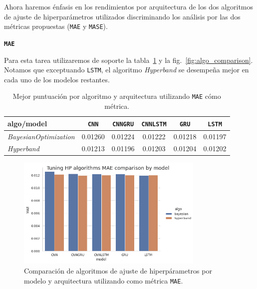 \documentclass[a4paper,12pt]{article}
\begin{document}
Ahora haremos énfasis en los rendimientos por arquitectura de los dos algoritmos de ajuste de hiperparámetros utilizados discriminando los análisis por las dos métricas propuestas (\texttt{MAE} y \texttt{MASE}). 

\hfill

\textbf{\texttt{MAE}}

Para esta tarea utilizaremos de soporte la tabla~\ref{tab:algo_vs_arch_mae} y la fig.~\ref{fig:algo_comparison}. Notamos que exceptuando \texttt{LSTM}, el algoritmo \textit{Hyperband} se desempeña mejor en cada uno de los modelos restantes.

\begin{table}[H]
\centering
\begin{tabular}{l|ccccc}
\hline
algo/model & \texttt{CNN} & \texttt{CNNGRU} & \texttt{CNNLSTM} & \texttt{GRU} & \texttt{LSTM} \\ \hline
\textit{BayesianOptimization}         & 0.01260     & 0.01224        & 0.01222         & 0.01218     & 0.01197      \\
\textit{Hyperband}         & 0.01213     & 0.01196        & 0.01203         & 0.01204     & 0.01202      \\ \hline
\end{tabular}
\caption{Mejor puntuación por algoritmo y arquitectura utilizando \texttt{MAE} cómo métrica.}
\label{tab:algo_vs_arch_mae}
\end{table}

\begin{figure}[H]
	\begin{center}
	\includegraphics[width=0.8\textwidth]{model_vs_algo_hp_mae.png}
  	\caption{Comparación de algoritmos de ajuste de hiperpárametros por modelo y arquitectura utilizando como métrica \texttt{MAE}.}
  	\label{fig:algo_comparison_mae}
  	\end{center}
\end{figure}
\end{document}
